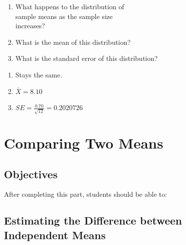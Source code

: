 \documentclass[11pt, chapterprefix=true]{scrbook}\usepackage[]{graphicx}\usepackage[]{color}
\begin{document}
\begin{exercises}
\begin{exercise}
\begin{enumerate}
  \item What happens to the distribution of \\ sample means as the sample size \\ increases?
  \item What is the mean of this distribution? 
  \item What is the standard error of this distribution?
\end{enumerate}

\end{exercise}  
\begin{solution}  %

\begin{enumerate}
  \item Stays the same.
  \item $\bar{X} = 8.10$
  \item $ SE = \frac{0.70}{\sqrt{12}} = 0.2020726$ 
\end{enumerate}

\end{solution}


\end{exercises}

\onecolumn



\chapter{Comparing Two Means}
\label{chap:ch12}

\section{Objectives}

After completing this part, students should be able to:


\section{Estimating the Difference between Independent Means}  
\end{document}
